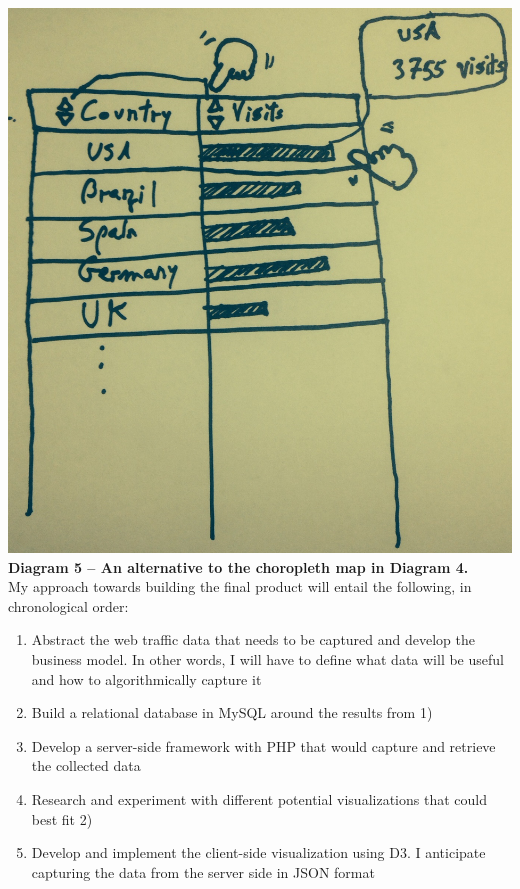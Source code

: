 \documentclass[12pt]{article}
\begin{document}
\noindent\includegraphics[scale=0.3]{img/table}
\noindent\textbf{Diagram 5 -- An alternative to the choropleth map in Diagram 4.} \\

My approach towards building the final product will entail the following, in chronological order:
\begin{enumerate}
\item Abstract the web traffic data that needs to be captured and develop the business model. In other words, I will have to define what data will be useful and how to algorithmically capture it
\item Build a relational database in MySQL around the results from 1)
\item Develop a server-side framework with PHP that would capture and retrieve the collected data
\item Research and experiment with different potential visualizations that could best fit 2)
\item Develop and implement the client-side visualization using D3. I anticipate capturing the data from the server side in JSON format
\end{enumerate}

\vfill
\end{document}
